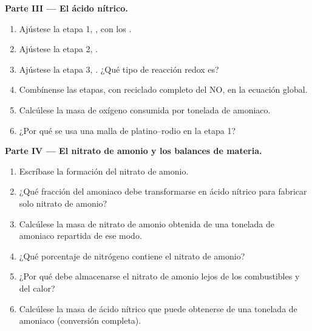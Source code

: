 \begin{problem}
\medskip
\noindent\textbf{Parte III --- El ácido nítrico.}
\begin{enumerate}[resume]
  \item Ajústese la etapa 1, , con los . %
  \item Ajústese la etapa 2, . %
  \item Ajústese la etapa 3, . ¿Qué tipo de %
        reacción redox es?
  \item Combínense las etapas, con reciclado completo del NO, en la
        ecuación global.
  \item Calcúlese la masa de oxígeno consumida por tonelada de amoniaco.
  \item ¿Por qué se usa una malla de platino--rodio en la etapa 1?
\end{enumerate}

\medskip
\noindent\textbf{Parte IV --- El nitrato de amonio y los balances de materia.}
\begin{enumerate}[resume]
  \item Escríbase la formación del nitrato de amonio.
  \item ¿Qué fracción del amoniaco debe transformarse en ácido nítrico
        para fabricar solo nitrato de amonio?
  \item Calcúlese la masa de nitrato de amonio obtenida de una tonelada de
        amoniaco repartida de ese modo.
  \item ¿Qué porcentaje de nitrógeno contiene el nitrato de amonio?
  \item ¿Por qué debe almacenarse el nitrato de amonio lejos de los
        combustibles y del calor?
  \item Calcúlese la masa de ácido nítrico que puede obtenerse de una
        tonelada de amoniaco (conversión completa).
\end{enumerate}
\end{problem}
